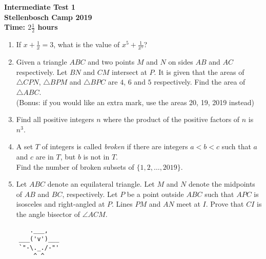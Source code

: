 \documentclass{article}
\begin{document}
\thispagestyle{empty}

\begin{center}
  \textbf{\Large Intermediate Test 1}
  \\ \vspace{1em}
  \textbf{\large Stellenbosch Camp 2019}
  \\ \vspace{1em}
  \textbf{\large Time: $2\frac{1}{2}$ hours}
\end{center}


\begin{enumerate}[1.]

\item %
If $x + \frac{1}{x} = 3$, what is the value of $x^5 + \frac{1}{x^5}$?\\



\item %
Given a triangle $ABC$ and two points $M$ and $N$ on sides $AB$ and $AC$ respectively. Let $BN$ and $CM$ intersect at $P$. It is given that the areas of $\triangle CPN$, $\triangle BPM$ and $\triangle BPC$ are $4$, $6$ and $5$ respectively.
Find the area of $\triangle ABC$.\\
(Bonus: if you would like an extra mark, use the areas 20, 19, 2019 instead)\\



\item %
Find all positive integers $n$ where the product of the positive factors of $n$ is $n^3$.\\



\item %
A set $T$ of integers is called \textit{broken} if there are integers $a < b < c$ such that $a$ and $c$ are in $T$, but $b$ is not in $T$.\\
Find the number of broken subsets of $\{1, 2, \dots, 2019\}$.\\



\item %
Let $ABC$ denote an equilateral triangle. Let $M$ and $N$ denote the midpoints of $AB$ and $BC$, respectively.
Let $P$ be a point outside $ABC$ such that $APC$ is isosceles and right-angled at $P$. Lines $PM$ and $AN$ meet at $I$.
Prove that $CI$ is the angle bisector of $\angle ACM$.\\

\end{enumerate}


\vfill
\begin{center} \begin{verbatim}
       .___,   
    ___('v')___
    `"-\._./-"'
        ^ ^ 

\end{verbatim} \end{center}
\end{document}
